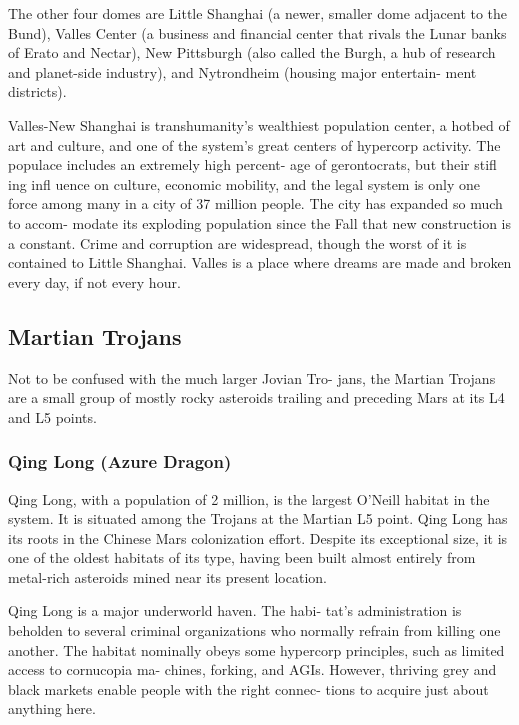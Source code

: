 The other four domes are Little Shanghai (a newer, 
smaller dome adjacent to the Bund), Valles Center 
(a business and financial center that rivals the Lunar 
banks of Erato and Nectar), New Pittsburgh (also 
called the Burgh, a hub of research and planet-side 
industry), and Nytrondheim (housing major entertain-
ment districts).

Valles-New Shanghai is transhumanity's wealthiest 
population center, a hotbed of art and culture, and 
one of the system's great centers of hypercorp activity. 
The populace includes an extremely high percent-
age of gerontocrats, but their stifl ing  infl uence  on 
culture, economic mobility, and the legal system is 
only one force among many in a city of 37 million 
people. The city has expanded so much to accom-
modate its exploding population since the Fall that 
new construction is a constant. Crime and corruption 
are widespread, though the worst of it is contained 
to Little Shanghai. Valles is a place where dreams are 
made and broken every day, if not every hour.

\subsection{Martian Trojans}

Not to be confused with the much larger Jovian Tro-
jans, the Martian Trojans are a small group of mostly 
rocky asteroids trailing and preceding Mars at its L4 
and L5 points.

\subsubsection{Qing Long (Azure Dragon)}

Qing Long, with a population of 2 million, is the 
largest O'Neill habitat in the system. It is situated 
among the Trojans at the Martian L5 point. Qing 
Long has its roots in the Chinese Mars colonization 
effort. Despite its exceptional size, it is one of the 
oldest habitats of its type, having been built almost 
entirely from metal-rich asteroids mined near its 
present location.

Qing Long is a major underworld haven. The habi-
tat's administration is beholden to several criminal 
organizations who normally refrain from killing one 
another. The habitat nominally obeys some hypercorp 
principles, such as limited access to cornucopia ma-
chines, forking, and AGIs. However, thriving grey and 
black markets enable people with the right connec-
tions to acquire just about anything here.

